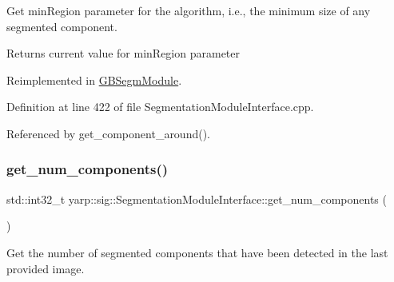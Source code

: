 Get min\+Region parameter for the algorithm, i.\+e., the minimum size of any segmented component. 

\begin{DoxyReturn}{Returns}
current value for min\+Region parameter 
\end{DoxyReturn}


Reimplemented in \hyperlink{classGBSegmModule_a2378b95e60b406a119947aa86b5bb9c4}{G\+B\+Segm\+Module}.



Definition at line 422 of file Segmentation\+Module\+Interface.\+cpp.



Referenced by get\+\_\+component\+\_\+around().


\mbox{\label{classyarp_1_1sig_1_1SegmentationModuleInterface_a253cb5a4d4250b97842537b664a93064}} 
\subsubsection{\texorpdfstring{get\+\_\+num\+\_\+components()}{get\_num\_components()}}
{\footnotesize\ttfamily std\+::int32\+\_\+t yarp\+::sig\+::\+Segmentation\+Module\+Interface\+::get\+\_\+num\+\_\+components (\begin{DoxyParamCaption}{ }\end{DoxyParamCaption})\hspace{0.3cm}{\ttfamily [virtual]}}



Get the number of segmented components that have been detected in the last provided image. 

